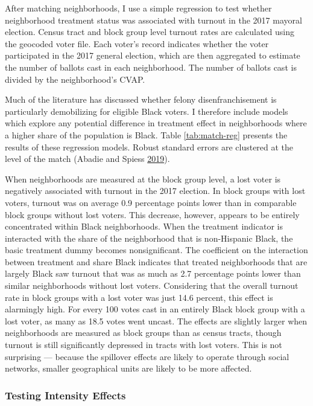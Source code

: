 \documentclass[12pt,]{article}
\begin{document}
After matching neighborhoods, I use a simple regression to test whether neighborhood treatment status was associated with turnout in the 2017 mayoral election. Census tract and block group level turnout rates are calculated using the geocoded voter file. Each voter's record indicates whether the voter participated in the 2017 general election, which are then aggregated to estimate the number of ballots cast in each neighborhood. The number of ballots cast is divided by the neighborhood's CVAP.

Much of the literature has discussed whether felony disenfranchisement is particularly demobilizing for eligible Black voters. I therefore include models which explore any potential difference in treatment effect in neighborhoods where a higher share of the population is Black. Table \ref{tab:match-reg} presents the results of these regression models. Robust standard errors are clustered at the level of the match (Abadie and Spiess \protect\hyperlink{ref-Abadie2019}{2019}).



When neighborhoods are measured at the block group level, a lost voter is negatively associated with turnout in the 2017 election. In block groups with lost voters, turnout was on average 0.9 percentage points lower than in comparable block groups without lost voters. This decrease, however, appears to be entirely concentrated within Black neighborhoods. When the treatment indicator is interacted with the share of the neighborhood that is non-Hispanic Black, the basic treatment dummy becomes nonsignificant. The coefficient on the interaction between treatment and share Black indicates that treated neighborhoods that are largely Black saw turnout that was as much as 2.7 percentage points lower than similar neighborhoods without lost voters. Considering that the overall turnout rate in block groups with a lost voter was just 14.6 percent, this effect is alarmingly high. For every 100 votes cast in an entirely Black block group with a lost voter, as many as 18.5 votes went uncast. The effects are slightly larger when neighborhoods are measured as block groups than as census tracts, though turnout is still significantly depressed in tracts with lost voters. This is not surprising --- because the spillover effects are likely to operate through social networks, smaller geographical units are likely to be more affected.

\hypertarget{testing-intensity-effects}{%
\subsubsection*{Testing Intensity Effects}\label{testing-intensity-effects}}
\end{document}
